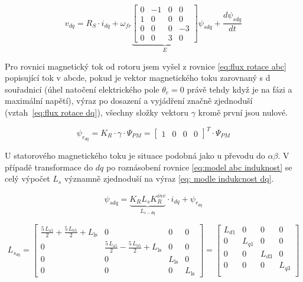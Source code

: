 \begin{equation}
    \label{eq:model dq v}
    v_{dq}=R_S\cdot i_{dq}+\omega_{fr} 
    \underbrace{
    \begin{bmatrix}
    0 &-1&0&0\\
    1&0&0&0\\
    0&0&0&-3\\
    0&0&3&0 
    \end{bmatrix}}_{E}\psi_{sdq}+\frac{d\psi_{sdq}}{dt}
\end{equation}

Pro rovnici magnetický tok od rotoru jsem vyšel z rovnice \ref{eq:flux rotace abc} popisující tok v abcde, pokud je vektor magnetického toku zarovnaný s d souřadnicí (úhel natočení elektrického pole $\theta_e=0$ právě tehdy když je na fázi a maximální napětí), výraz po dosazení a vyjádření značně zjednoduší (vztah~\ref{eq:flux rotace dq}), všechny složky vektoru $\gamma$ kromě první jsou nulové. 


\begin{equation}
    \label{eq:flux rotace dq}
    \psi_{r_{dq}}=K_R\cdot \gamma \cdot\Psi_{PM}
 =\begin{bmatrix}
        1&0&0&0
    \end{bmatrix}^T \cdot
    \Psi_{PM}
\end{equation}



U statorového magnetického toku je situace podobná jako u převodu do $\alpha \beta$. V případě transformace do $dq$ po roznásobení rovnice \ref{eq:model abc induknost} se celý výpočet $L_s$ významně zjednoduší na výraz \ref{eq: modle indukcnost dq}.       


\begin{equation}
    \psi_{sdq}=
     \underbrace{K_RL_sK_{R}^{inv}}_{L_{s-dq}} 
    \cdot i_{dq}+ \psi_{r_{dq}}
\end{equation}

\begin{equation}
\label{eq: modle indukcnost dq}
    L_{s_{dq}}=
    \begin{bmatrix}    
    \frac{5\,L_{\textrm{a5}} }{2}+\frac{5\,L_{\textrm{b5}} }{2}+L_{\textrm{ls}}  & 0 & 0 & 0\\
    0 & \frac{5\,L_{\textrm{a5}} }{2}-\frac{5\,L_{\textrm{b5}} }{2}+L_{\textrm{ls}}  & 0 & 0\\
    0 & 0 & L_{\textrm{ls}}  & 0\\
    0 & 0 & 0 & L_{\textrm{ls}} 
    \end{bmatrix}=
    \begin{bmatrix}
        L_{d1} &0&0&0\\
        0 &L_{q1}&0&0\\
        0 &0&L_{d3}&0\\
        0 &0&0&L_{q3}\\
    \end{bmatrix}
\end{equation}

